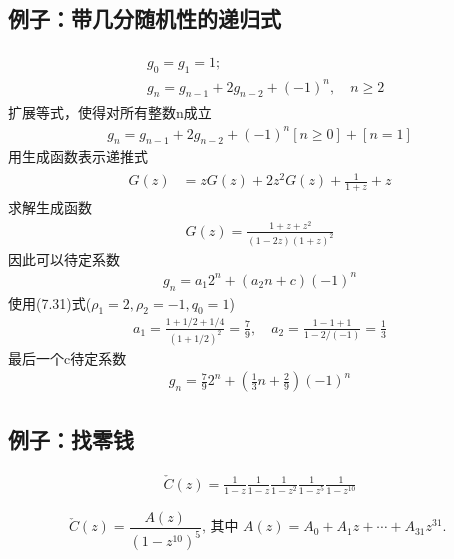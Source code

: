 \subsection{例子：带几分随机性的递归式}
\begin{align*}
    \begin{aligned}
    &g_{0}=g_{1}=1 ; \\
    &g_{n}=g_{n-1}+2 g_{n-2}+(-1)^{n}, \quad n \ge 2
    \end{aligned}
\end{align*}
扩展等式，使得对所有整数n成立
\begin{align*}
    g_{n}=g_{n-1}+2 g_{n-2}+(-1)^{n}[n \ge 0]+[n=1]
\end{align*}
用生成函数表示递推式
\begin{align*}
    \begin{aligned}
    G(z) &=z G(z)+2 z^{2} G(z)+\frac{1}{1+z}+z
    \end{aligned}
\end{align*}
求解生成函数
\begin{align*}
    G(z)=\frac{1+z+z^{2}}{(1-2 z)(1+z)^{2}}
\end{align*}
因此可以待定系数
\begin{align*}
    g_{n}=a_{1} 2^{n}+\left(a_{2} n+c\right)(-1)^{n}
\end{align*}
使用(7.31)式($\rho_1 = 2, \rho_2 = -1, q_0 = 1$)
\begin{align*}
    a_{1}=\frac{1+1 / 2+1 / 4}{(1+1 / 2)^{2}}=\frac{7}{9}, \quad a_{2}=\frac{1-1+1}{1-2 /(-1)}=\frac{1}{3}
\end{align*}
最后一个c待定系数
\begin{align*}
    g_{n}=\frac{7}{9} 2^{n}+\left(\frac{1}{3} n+\frac{2}{9}\right)(-1)^{n}
\end{align*}

\subsection{例子：找零钱}

\begin{align*}
    \check{C}(z)=\frac{1}{1-z} \frac{1}{1-z} \frac{1}{1-z^{2}} \frac{1}{1-z^{5}} \frac{1}{1-z^{10}}
\end{align*}

\setcounter{equation}{38}
\begin{equation}
    \check{C}(z)=\frac{A(z)}{\left(1-z^{10}\right)^{5}} \text {, 其中 } A(z)=A_{0}+A_{1} z+\cdots+A_{31} z^{31} \text {. }
\end{equation}

